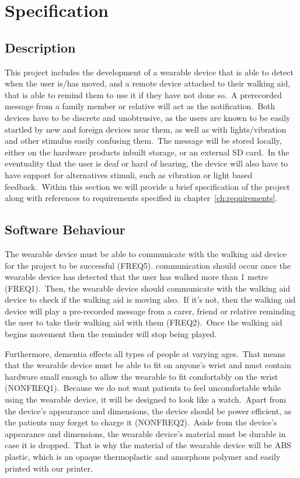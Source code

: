 \chapter{Specification}\label{ch:specification}
    \section{Description}

        This project includes the development of a wearable device that is able to detect when the user is/has moved,
        and a remote device attached to their walking aid, that is able to remind them to use it if they have not done
        so.\ A prerecorded message from a family member or relative will act as the notification.\ Both devices have to
        be discrete and unobtrusive, as the users are known to be easily startled by new and foreign devices near them,
        as well as with lights/vibration and other stimulus easily confusing them.\ The message will be stored locally,
        either on the hardware products inbuilt storage, or an external SD card.\ In the eventuality that the user is
        deaf or hard of hearing, the device will also have to have support for alternatives stimuli, such as vibration
        or light based feedback.\ Within this section we will provide a brief specification of the project along with
        references to requirements specified in chapter~\ref{ch:requirements}.

    \section{Software Behaviour}
        The wearable device must be able to communicate with the walking aid device for the project to be successful
        (FREQ5). \This communication should occur once the wearable device has detected that the user has walked more
        than 1 metre (FREQ1).\ Then, the wearable device should communicate with the walking aid device to check if the
        walking aid is moving also.\ If it's not, then the walking aid device will play a pre-recorded message from a
        carer, friend or relative reminding the user to take their walking aid with them (FREQ2).\ Once the walking aid
        begins movement then the reminder will stop being played.

        Furthermore, dementia effects all types of people at varying ages.\ That means that the wearable device must be
        able to fit on anyone's wrist and must contain hardware small enough to allow the wearable to fit comfortably on
        the wrist (NONFREQ1).\ Because we do not want patients to feel uncomfortable while using the wearable device, it
        will be designed to look like a watch.\ Apart from the device's appearance and dimensions, the device should be
        power efficient, as the patients may forget to charge it (NONFREQ2).\ Aside from the device's appearance and
        dimensions, the wearable device's material must be durable in  case it is dropped.\ That is why the material of
        the wearable device will be ABS plastic, which is an opaque thermoplastic and amorphous polymer and easily printed
        with our printer.

